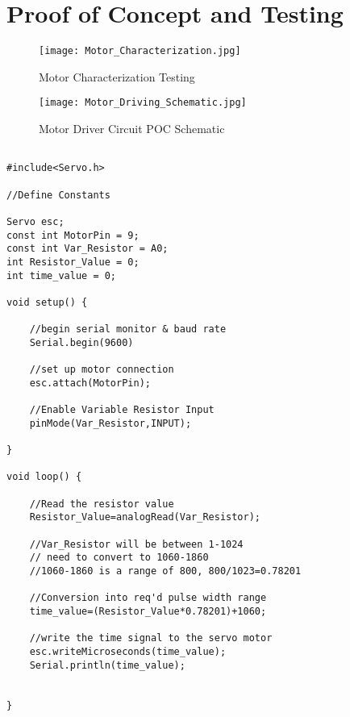 \section{Proof of Concept and Testing}

\begin{figure}[p]
  \centering
  \texttt{[image: Motor\_Characterization.jpg]}
  \caption{Motor Characterization Testing}
  \label{fig:Motor_Char}
\end{figure}

\begin{figure}[p]
  \centering
  \texttt{[image: Motor\_Driving\_Schematic.jpg]}
  \caption{Motor Driver Circuit POC Schematic}
  \label{fig:Motor_Drive_Schem}
\end{figure}

\begin{lstlisting}

#include<Servo.h>

//Define Constants

Servo esc;
const int MotorPin = 9;
const int Var_Resistor = A0;
int Resistor_Value = 0;
int time_value = 0;

void setup() {
	
	//begin serial monitor & baud rate
	Serial.begin(9600)
	
	//set up motor connection
	esc.attach(MotorPin);  
	
	//Enable Variable Resistor Input
	pinMode(Var_Resistor,INPUT); 
	
}

void loop() {
	
	//Read the resistor value 
	Resistor_Value=analogRead(Var_Resistor);
	
	//Var_Resistor will be between 1-1024
	// need to convert to 1060-1860
	//1060-1860 is a range of 800, 800/1023=0.78201
	
	//Conversion into req'd pulse width range
	time_value=(Resistor_Value*0.78201)+1060;
	
	//write the time signal to the servo motor
	esc.writeMicroseconds(time_value);
	Serial.println(time_value);
	
	
}

\end{lstlisting}
